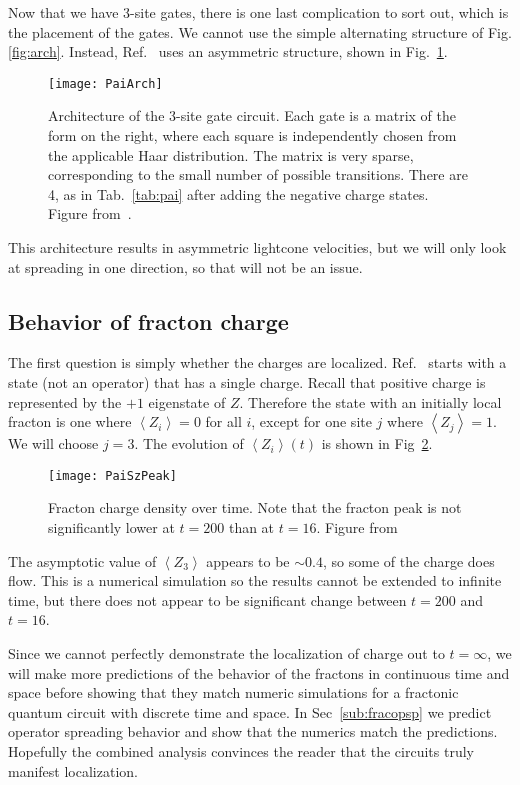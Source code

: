 \documentclass[a4paper,12pt]{article}
\newcommand{\ex}[1]{\left\langle #1 \right\rangle}
\begin{document}
Now that we have 3-site gates, there is one last complication to sort out, which is the placement of the gates. We cannot use the simple alternating structure of Fig.\ref{fig:arch}. Instead, Ref.~\cite{PaiFracton} uses an asymmetric structure, shown in Fig.~\ref{fig:PaiArch}.
\begin{figure}
	\centering
	\texttt{[image: PaiArch]}
	\caption{Architecture of the 3-site gate circuit. Each gate is a matrix of the form on the right, where each square is independently chosen from the applicable Haar distribution. The matrix is very sparse, corresponding to the small number of possible transitions. There are 4, as in Tab.~\ref{tab:pai} after adding the negative charge states. Figure from~\cite{PaiFracton}.}
	\label{fig:PaiArch}
\end{figure}
This architecture results in asymmetric lightcone velocities, but we will only look at spreading in one direction, so that will not be an issue.

\subsection{Behavior of fracton charge} \label{sub:fraccharge}

The first question is simply whether the charges are localized. Ref.~\cite{PaiFracton} starts with a state (not an operator) that has a single charge. 
Recall that positive charge is represented by the $+1$ eigenstate of $Z$. Therefore the state with an initially local fracton is one where $\ex{Z_i}=0$ for all $i$, except for one site $j$ where $\ex{Z_j}=1$. We will choose $j=3$.
The evolution of $\ex{Z_i}(t)$ is shown in Fig~\ref{fig:PaiSzPeak}.
\begin{figure}
	\centering
	\texttt{[image: PaiSzPeak]}
	\caption{Fracton charge density over time. Note that the fracton peak is not significantly lower at $t=200$ than at $t=16$. Figure from~\cite{PaiFracton}}
	\label{fig:PaiSzPeak}
\end{figure}
The asymptotic value of $\ex{Z_3}$ appears to be $\sim0.4$, so some of the charge does flow. This is a numerical simulation so the results cannot be extended to infinite time, but there does not appear to be significant change between $t=200$ and $t=16$.

Since we cannot perfectly demonstrate the localization of charge out to $t=\infty$, we will make more predictions of the behavior of the fractons in continuous time and space before showing that they match numeric simulations for a fractonic quantum circuit with discrete time and space. In Sec~\ref{sub:fracopsp} we predict operator spreading behavior and show that the numerics match the predictions. Hopefully the combined analysis convinces the reader that the circuits truly manifest localization.
\end{document}
